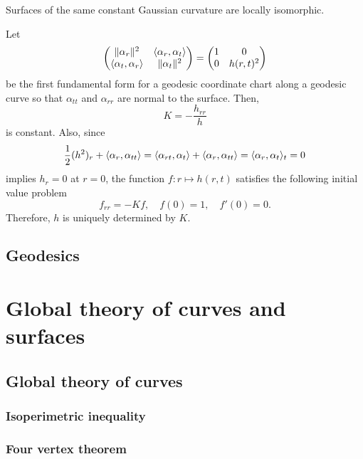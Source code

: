 \documentclass{../note}
\def\a{\alpha}
\begin{document}
\begin{thm}
Surfaces of the same constant Gaussian curvature are locally isomorphic.
\end{thm}
\begin{pf}
Let
\[\mat{\|\a_r\|^2&\<\a_r,\a_t\>\\\<\a_t,\a_r\>&\|\a_t\|^2}=\mat{1&0\\0&h(r,t)^2}\]
be the first fundamental form for a geodesic coordinate chart along a geodesic curve so that $\a_{tt}$ and $\a_{rr}$ are normal to the surface.
Then,
\[K=-\frac{h_{rr}}h\]
is constant.
Also, since
\[\frac12(h^2)_r+\<\a_r,\a_{tt}\>=\<\a_{rt},\a_t\>+\<\a_r,\a_{tt}\>=\<\a_r,\a_t\>_t=0\]
implies $h_r=0$ at $r=0$, the function $f:r\mapsto h(r,t)$ satisfies the following initial value problem
\[f_{rr}=-Kf,\quad f(0)=1,\quad f'(0)=0.\]
Therefore, $h$ is uniquely determined by $K$.
\end{pf}



\chapter{Geodesics}






























\part{Global theory of curves and surfaces}

\chapter{Global theory of curves}
\section{Isoperimetric inequality}
\section{Four vertex theorem}
\end{document}
